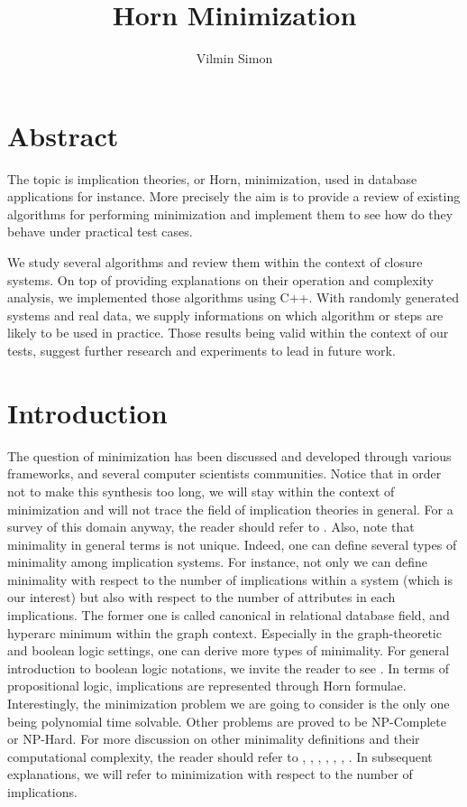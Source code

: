\documentclass[runningheads]{llncs}
\title{Horn Minimization}
\author{Vilmin Simon}
\institute{Higher School of Economics - Faculty of Computer Science}
\begin{document}
	
\maketitle
	
\section{Abstract}

The topic is implication theories, or Horn, minimization, used in database applications for instance. More precisely the aim is to provide a review of existing algorithms for performing minimization and implement them to see how do
they behave under practical test cases.

We study several algorithms and review them within the context of closure
systems. On top of providing explanations on their operation and complexity analysis, we implemented those algorithms using C++. With randomly generated systems and real data, we supply informations on which algorithm or steps are likely to be used in practice. Those results being valid within the context of our tests, suggest further research and experiments to lead in future work.
	
\section{Introduction}

The question of minimization has been discussed and developed through various 
frameworks, and several computer scientists communities. Notice that in order 
not to make this synthesis too long, we will stay within the context of 
minimization and will not trace the field of implication theories in general. 
For a survey of this domain anyway, the reader should refer to 
\cite{wild_joy_2017}. Also, note that minimality in general terms is not 
unique. Indeed, one can define several types of minimality among implication 
systems. For instance, not only we can define minimality with respect to the 
number of implications within a system (which is our interest) but also with 
respect to the number of attributes in each implications. The former one is 
called canonical in relational database field, and hyperarc 
minimum within the graph context. Especially in the graph-theoretic and 
boolean logic settings, one can derive more types of minimality. For general 
introduction to boolean logic notations, we invite the reader to see 
\cite{cori_mathematical_2000}. In terms of propositional logic, implications 
are represented through Horn formulae. Interestingly, the minimization problem 
we are going to consider is the only one being polynomial time solvable. Other 
problems are proved to be NP-Complete or NP-Hard. For more discussion on other 
minimality definitions and their computational complexity, the reader should 
refer to \cite{boros_strong_2017}, \cite{ausiello_directed_2017}, 
	\cite{ganter_conceptual_2016}, \cite{ausiello_minimal_1986}, \cite{wild_joy_2017}, \cite{boros_horn_1998}, \cite{hammer_optimal_1993}. In subsequent explanations, we will refer to minimization with respect to the number of implications.
\end{document}
